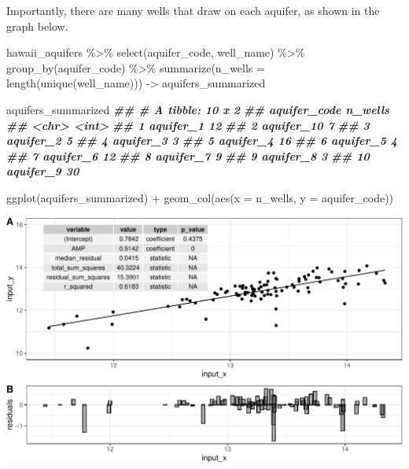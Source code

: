 \documentclass[
]{krantz}
\newenvironment{Shaded}{\begin{snugshade}}{\end{snugshade}}
\newcommand{\AttributeTok}[1]{\textcolor[rgb]{0.77,0.63,0.00}{#1}}
\newcommand{\DocumentationTok}[1]{\textcolor[rgb]{0.56,0.35,0.01}{\textbf{\textit{#1}}}}
\newcommand{\FunctionTok}[1]{\textcolor[rgb]{0.00,0.00,0.00}{#1}}
\newcommand{\NormalTok}[1]{#1}
\newcommand{\OtherTok}[1]{\textcolor[rgb]{0.56,0.35,0.01}{#1}}
\newcommand{\SpecialCharTok}[1]{\textcolor[rgb]{0.00,0.00,0.00}{#1}}
\begin{document}
Importantly, there are many wells that draw on each aquifer, as shown in the graph below.

\begin{Shaded}
\begin{Highlighting}[]
\NormalTok{hawaii\_aquifers }\SpecialCharTok{\%\textgreater{}\%}
  \FunctionTok{select}\NormalTok{(aquifer\_code, well\_name) }\SpecialCharTok{\%\textgreater{}\%}
  \FunctionTok{group\_by}\NormalTok{(aquifer\_code) }\SpecialCharTok{\%\textgreater{}\%}
  \FunctionTok{summarize}\NormalTok{(}\AttributeTok{n\_wells =} \FunctionTok{length}\NormalTok{(}\FunctionTok{unique}\NormalTok{(well\_name))) }\OtherTok{{-}\textgreater{}}\NormalTok{ aquifers\_summarized}

\NormalTok{aquifers\_summarized}
\DocumentationTok{\#\# \# A tibble: 10 x 2}
\DocumentationTok{\#\#    aquifer\_code n\_wells}
\DocumentationTok{\#\#    \textless{}chr\textgreater{}          \textless{}int\textgreater{}}
\DocumentationTok{\#\#  1 aquifer\_1         12}
\DocumentationTok{\#\#  2 aquifer\_10         7}
\DocumentationTok{\#\#  3 aquifer\_2          5}
\DocumentationTok{\#\#  4 aquifer\_3          3}
\DocumentationTok{\#\#  5 aquifer\_4         16}
\DocumentationTok{\#\#  6 aquifer\_5          4}
\DocumentationTok{\#\#  7 aquifer\_6         12}
\DocumentationTok{\#\#  8 aquifer\_7          9}
\DocumentationTok{\#\#  9 aquifer\_8          3}
\DocumentationTok{\#\# 10 aquifer\_9         30}

\FunctionTok{ggplot}\NormalTok{(aquifers\_summarized) }\SpecialCharTok{+} \FunctionTok{geom\_col}\NormalTok{(}\FunctionTok{aes}\NormalTok{(}\AttributeTok{x =}\NormalTok{ n\_wells, }\AttributeTok{y =}\NormalTok{ aquifer\_code))}
\end{Highlighting}
\end{Shaded}

\begin{center}\includegraphics{index_files/figure-latex/unnamed-chunk-132-1} \end{center}
\end{document}

